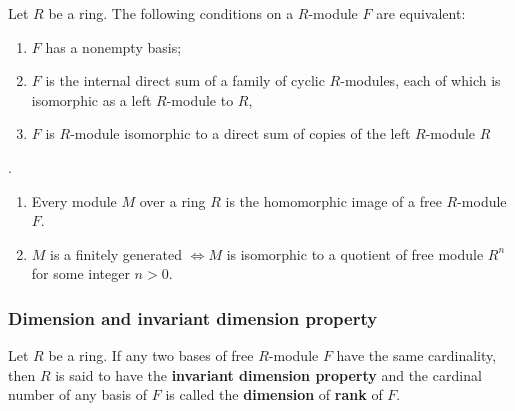 \begin{theorem}
    \label{thm: Free unitary R-module}
    Let $R$ be a ring.
    The following conditions on a $R$-module $F$ are equivalent:
    \begin{enumerate}
        \item
              $F$ has a nonempty basis;

        \item
              $F$ is the internal direct sum of a family of cyclic $R$-modules, each of which is isomorphic as a left $R$-module to $R$,

        \item
              $F$ is $R$-module isomorphic to a direct sum of copies of the left $R$-module $R$
    \end{enumerate}
\end{theorem}


\begin{corollary}
    \label{cor: Every unitary module $M$ over a ring $R$ with identity is the homomorphic image of a free  unitary $R$-module $F$.}.

    \begin{enumerate}
        \item
              Every module $M$ over a ring $R$ is the homomorphic image of a free $R$-module $F$.
        \item
              $M$ is a finitely generated $\Leftrightarrow M$ is isomorphic to a quotient of free module $R^n$ for some integer $n>0$.
    \end{enumerate}
\end{corollary}


\subsubsection{Dimension and invariant dimension property} %


\begin{definition}
    Let $R$ be a ring.
    If any two bases of free $R$-module $F$ have the same cardinality, then $R$ is said to have the \textbf{invariant dimension property} and the cardinal number of any basis of $F$ is called the \textbf{dimension} of \textbf{rank} of $F$.
\end{definition}



